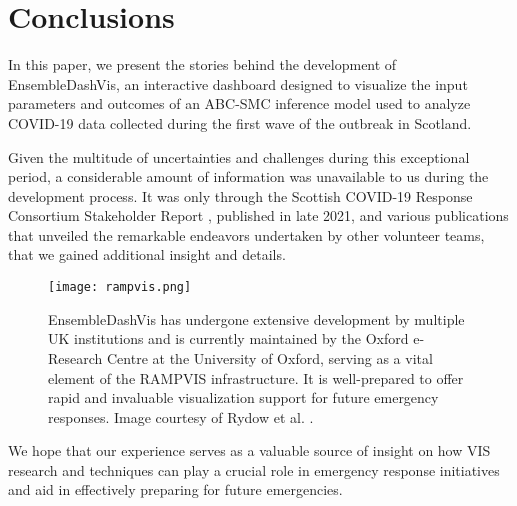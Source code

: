 \section{Conclusions}

In this paper, we present the stories behind the development of EnsembleDashVis, an interactive dashboard designed to visualize the input parameters and outcomes of an \ac{ABC-SMC} inference model used to analyze COVID-19 data collected during the first wave of the outbreak in Scotland.

Given the multitude of uncertainties and challenges during this exceptional period, a considerable amount of information was unavailable to us during the development process. It was only through the Scottish COVID-19 Response Consortium Stakeholder Report \cite{abdalla2021Scottish}, published in late 2021, and various publications \cite{chen2022RAMPVIS,dykes2022Visualizationb,khan2022Propagating,khan2022Rapid,rydow2023RAMPVIS} that unveiled the remarkable endeavors undertaken by other volunteer teams, that we gained additional insight and details.

\begin{figure}[tb!]
    \centering
    \texttt{[image: rampvis.png]}
    \caption{EnsembleDashVis has undergone extensive development by multiple UK institutions and is currently maintained by the Oxford e-Research Centre at the University of Oxford, serving as a vital element of the RAMPVIS infrastructure. It is well-prepared to offer rapid and invaluable visualization support for future emergency responses. Image courtesy of Rydow et al. \cite{rydow2023RAMPVIS}.
    }
    \label{fig:rampvis}

\end{figure}

We hope that our experience serves as a valuable source of insight on how VIS research and techniques can play a crucial role in emergency response initiatives and aid in effectively preparing for future emergencies.